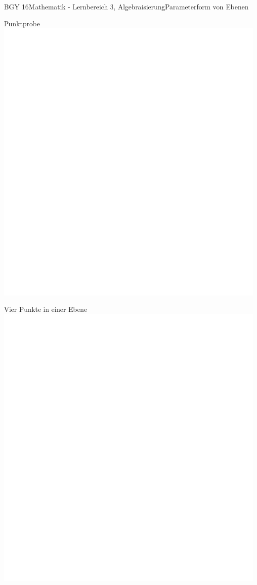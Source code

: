 \documentclass[oneside,openany,headings=optiontotoc,11pt,numbers=noenddot]{scrreprt}
\begin{document}
\begin{worksheet}{BGY 16}{Mathematik - Lernbereich 3, Algebraisierung}{Parameterform von Ebenen}
\begin{framed}
		\end{framed}
		\begin{framed}
			\tiny{\color{codegray}Punktprobe}\\
			\includegraphics[scale=0.43]{../empty.jpg}
		\end{framed}
		\begin{framed}
			\tiny{\color{codegray}Vier Punkte in einer Ebene}\\
			\includegraphics[scale=0.43]{../empty.jpg}
		\end{framed}
	\end{worksheet}
\end{document}
